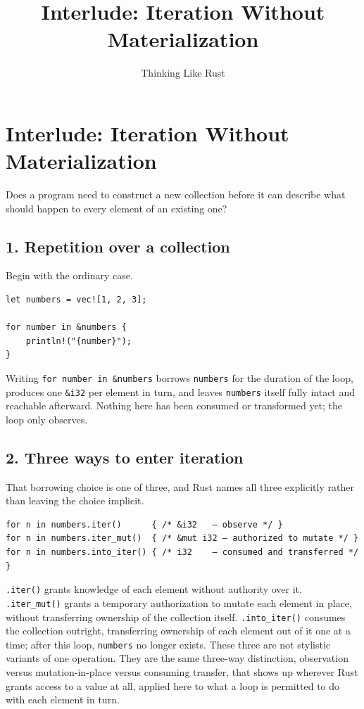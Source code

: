\documentclass[11pt]{book}
\title{Interlude: Iteration Without Materialization}
\author{Thinking Like Rust}
\date{}
\begin{document}
\chapter*{Interlude: Iteration Without Materialization}

\begin{firstprinciples}
Does a program need to construct a new collection before it can describe what should happen to every element of an existing one?
\end{firstprinciples}

\section*{1. Repetition over a collection}

Begin with the ordinary case.

\begin{lstlisting}
let numbers = vec![1, 2, 3];

for number in &numbers {
    println!("{number}");
}
\end{lstlisting}

Writing \texttt{for number in \&numbers} borrows \texttt{numbers} for the duration of the loop, produces one \texttt{\&i32} per element in turn, and leaves \texttt{numbers} itself fully intact and reachable afterward. Nothing here has been consumed or transformed yet; the loop only observes.

\section*{2. Three ways to enter iteration}

That borrowing choice is one of three, and Rust names all three explicitly rather than leaving the choice implicit.

\begin{lstlisting}
for n in numbers.iter()      { /* &i32   — observe */ }
for n in numbers.iter_mut()  { /* &mut i32 — authorized to mutate */ }
for n in numbers.into_iter() { /* i32    — consumed and transferred */ }
\end{lstlisting}

\texttt{.iter()} grants knowledge of each element without authority over it. \texttt{.iter\_mut()} grants a temporary authorization to mutate each element in place, without transferring ownership of the collection itself. \texttt{.into\_iter()} consumes the collection outright, transferring ownership of each element out of it one at a time; after this loop, \texttt{numbers} no longer exists. These three are not stylistic variants of one operation. They are the same three-way distinction, observation versus mutation-in-place versus consuming transfer, that shows up wherever Rust grants access to a value at all, applied here to what a loop is permitted to do with each element in turn.
\end{document}
